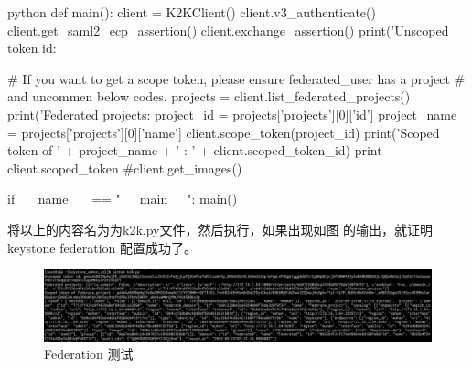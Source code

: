 \begin{code-block}{python}
def main():
    client = K2KClient()
    client.v3_authenticate()
    client.get_saml2_ecp_assertion()
    client.exchange_assertion()
    print('Unscoped token id: %

    # If you want to get a scope token, please ensure federated_user has a project
    # and uncommen below codes.
    projects = client.list_federated_projects()
    print('Federated projects: %
    project_id = projects['projects'][0]['id']
    project_name = projects['projects'][0]['name']
    client.scope_token(project_id)
    print('Scoped token of ' + project_name + ' : ' + client.scoped_token_id)
    print client.scoped_token
    #client.get_images()


if __name__ == "__main__":
    main()
\end{code-block}
将以上的内容名为为k2k.py文件，然后执行，如果出现如图 的输出，就证明keystone federation
配置成功了。
\begin{figure}[H]
  \centering
  \includegraphics[scale=0.20]{k2k_result.png}
  \caption{Federation 测试}
  \label{fig:k2k_result}
\end{figure}

